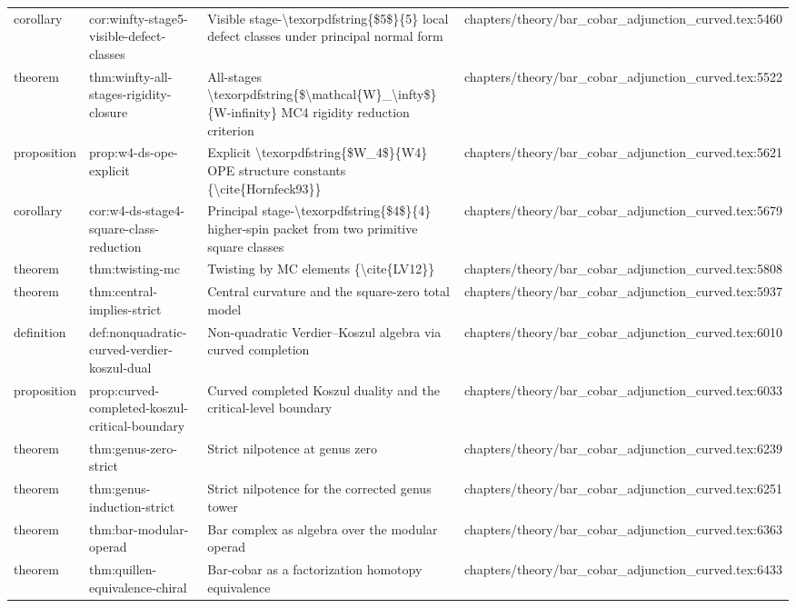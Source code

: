 \documentclass[11pt]{article}
\begin{document}
\begin{longtable}{L{0.10\textwidth}L{0.26\textwidth}L{0.42\textwidth}L{0.22\textwidth}}
corollary & cor:winfty-stage5-visible-defect-classes & Visible stage-\textbackslash{}texorpdfstring\{\$5\$\}\{5\} local defect classes under principal normal form & chapters/theory/bar\_cobar\_adjunction\_curved.tex:5460\\
theorem & thm:winfty-all-stages-rigidity-closure & All-stages \textbackslash{}texorpdfstring\{\$\textbackslash{}mathcal\{W\}\_\textbackslash{}infty\$\}\{W-infinity\} MC4 rigidity reduction criterion & chapters/theory/bar\_cobar\_adjunction\_curved.tex:5522\\
proposition & prop:w4-ds-ope-explicit & Explicit \textbackslash{}texorpdfstring\{\$W\_4\$\}\{W4\} OPE structure constants \{\textbackslash{}cite\{Hornfeck93\}\} & chapters/theory/bar\_cobar\_adjunction\_curved.tex:5621\\
corollary & cor:w4-ds-stage4-square-class-reduction & Principal stage-\textbackslash{}texorpdfstring\{\$4\$\}\{4\} higher-spin packet from two primitive square classes & chapters/theory/bar\_cobar\_adjunction\_curved.tex:5679\\
theorem & thm:twisting-mc & Twisting by MC elements \{\textbackslash{}cite\{LV12\}\} & chapters/theory/bar\_cobar\_adjunction\_curved.tex:5808\\
theorem & thm:central-implies-strict & Central curvature and the square-zero total model & chapters/theory/bar\_cobar\_adjunction\_curved.tex:5937\\
definition & def:nonquadratic-curved-verdier-koszul-dual & Non-quadratic Verdier--Koszul algebra via curved completion & chapters/theory/bar\_cobar\_adjunction\_curved.tex:6010\\
proposition & prop:curved-completed-koszul-critical-boundary & Curved completed Koszul duality and the critical-level boundary & chapters/theory/bar\_cobar\_adjunction\_curved.tex:6033\\
theorem & thm:genus-zero-strict & Strict nilpotence at genus zero & chapters/theory/bar\_cobar\_adjunction\_curved.tex:6239\\
theorem & thm:genus-induction-strict & Strict nilpotence for the corrected genus tower & chapters/theory/bar\_cobar\_adjunction\_curved.tex:6251\\
theorem & thm:bar-modular-operad & Bar complex as algebra over the modular operad & chapters/theory/bar\_cobar\_adjunction\_curved.tex:6363\\
theorem & thm:quillen-equivalence-chiral & Bar-cobar as a factorization homotopy equivalence & chapters/theory/bar\_cobar\_adjunction\_curved.tex:6433\\

\end{longtable}
\end{document}
